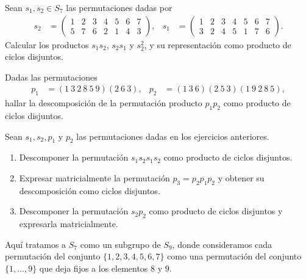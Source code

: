 \begin{ejercicio}\label{ej:2.14}
    Sean $s_1, s_2 \in S_7$ las permutaciones dadas por
    \begin{align*}
        s_2 &= \begin{pmatrix} 1 & 2 & 3 & 4 & 5 & 6 & 7 \\ 5 & 7 & 6 & 2 & 1 & 4 & 3 \end{pmatrix}, &
        s_1 &= \begin{pmatrix} 1 & 2 & 3 & 4 & 5 & 6 & 7 \\ 3 & 2 & 4 & 5 & 1 & 7 & 6 \end{pmatrix}.
    \end{align*}
    Calcular los productos $s_1s_2$, $s_2s_1$ y $s_2^2$, y su representación como producto de ciclos disjuntos.
\end{ejercicio}

\begin{ejercicio}\label{ej:2.15}
    Dadas las permutaciones
    \begin{align*}
        p_1 &= (1\ 3\ 2\ 8\ 5\ 9)(2\ 6\ 3), &
        p_2 &= (1\ 3\ 6)(2\ 5\ 3)(1\ 9\ 2\ 8\ 5),
    \end{align*}
    hallar la descomposición de la permutación producto $p_1p_2$ como producto de ciclos disjuntos.
\end{ejercicio}

\begin{ejercicio}\label{ej:2.16}
    Sean $s_1, s_2, p_1$ y $p_2$ las permutaciones dadas en los ejercicios anteriores.
    \begin{enumerate}
        \item Descomponer la permutación $s_1s_2s_1s_2$ como producto de ciclos disjuntos.
        \item Expresar matricialmente la permutación $p_3 = p_2p_1p_2$ y obtener su descomposición como ciclos disjuntos.
        \item Descomponer la permutación $s_2p_2$ como producto de ciclos disjuntos y expresarla matricialmente.
    \end{enumerate}
    \begin{observacion}
        Aquí tratamos a $S_7$ como un subgrupo de $S_9$, donde consideramos cada permutación del conjunto $\{1, 2, 3, 4, 5, 6, 7\}$ como una permutación del conjunto $\{1, \ldots, 9\}$ que deja fijos a los elementos $8$ y $9$.
    \end{observacion}
\end{ejercicio}

